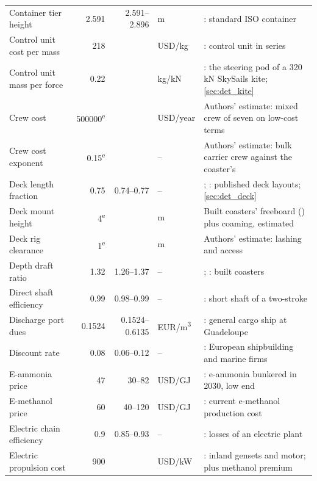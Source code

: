 \begin{longtable}{@{}>{\raggedright\arraybackslash}p{3.4cm}rr>{\raggedright\arraybackslash}p{1.4cm}>{\raggedright\arraybackslash}p{5.8cm}@{}}
Container tier height & \num{2.591} & \num{2.591}--\num{2.896} & m & \citet[p. 4]{hapaglloyd_container_spec}: standard ISO container \\
Control unit cost per mass & \num{218} &  & USD/kg & \citet[Tables 16.1 and 16.2]{faggiani2018}: control unit in series \\
Control unit mass per force & \num{0.22} &  & kg/kN & \citet{paulig2013}: the steering pod of a 320 kN SkySails kite; \cref{sec:det_kite} \\
Crew cost & \num{500000}\textsuperscript{e} &  & USD/year & Authors' estimate: mixed crew of seven on low-cost terms \\
Crew cost exponent & \num{0.15}\textsuperscript{e} &  & -- & Authors' estimate: bulk carrier crew against the coaster's \\
Deck length fraction & \num{0.75} & \num{0.74}--\num{0.77} & -- & \citet{han2025}; \citet{mboumba2022}: published deck layouts; \cref{sec:det_deck} \\
Deck mount height & \num{4}\textsuperscript{e} &  & m & Built coasters' freeboard (\citealp{damen2025cf3850}) plus coaming, estimated \\
Deck rig clearance & \num{1}\textsuperscript{e} &  & m & Authors' estimate: lashing and access \\
Depth draft ratio & \num{1.32} & \num{1.26}--\num{1.37} & -- & \citet{damen2025cf3850}; \citet{conoship2023cip3800}: built coasters \\
Direct shaft efficiency & \num{0.99} & \num{0.98}--\num{0.99} & -- & \citet[p. 24]{man2011}: short shaft of a two-stroke \\
Discharge port dues & \num{0.1524} & \num{0.1524}--\num{0.6135} & EUR/m\textsuperscript{3} & \citet[Art. 1-1]{gpmg2026droitsdeport}: general cargo ship at Guadeloupe \\
Discount rate & \num{0.08} & \num{0.06}--\num{0.12} & -- & \citet{damodaran2026wacc_europe}: European shipbuilding and marine firms \\
E-ammonia price & \num{47} & \num{30}--\num{82} & USD/GJ & \citet[Table B3]{lrumas2020}: e-ammonia bunkered in 2030, low end \\
E-methanol price & \num{60} & \num{40}--\num{120} & USD/GJ & \citet[Annex 3]{irena2021methanol}: current e-methanol production cost \\
Electric chain efficiency & \num{0.9} & \num{0.85}--\num{0.93} & -- & \citet{johannesen2021wartsila}: losses of an electric plant \\
Electric propulsion cost & \num{900} &  & USD/kW & \citet{eu2019dieselelectric}: inland gensets and motor; plus methanol premium \\

\end{longtable}
